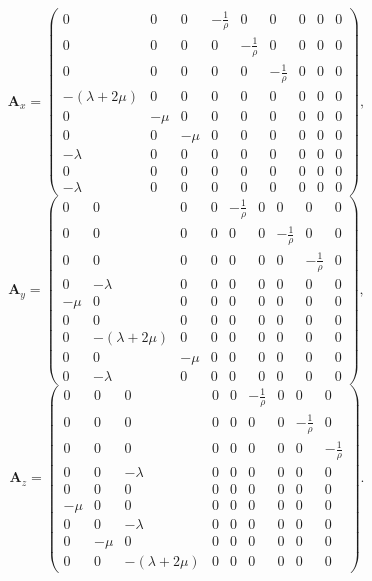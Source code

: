 \begin{displaymath}
\mathbf{A}_x =
\left( \begin{array}{cccccccccccc}
0 & 0 & 0 & -\frac 1 \rho & 0 & 0 & 0 & 0 & 0 \\ 
0 & 0 & 0 & 0 & -\frac 1 \rho & 0 & 0 & 0 & 0 \\ 
0 & 0 & 0 & 0 & 0 & -\frac 1 \rho & 0 & 0 & 0 \\ 
-(\lambda+2\mu) & 0 & 0 & 0 & 0 & 0 & 0 & 0 & 0 \\ 
0 & -\mu & 0 & 0 & 0 & 0 & 0 & 0 & 0 \\ 
0 & 0 & -\mu & 0 & 0 & 0 & 0 & 0 & 0 \\ 
-\lambda & 0 & 0 & 0 & 0 & 0 & 0 & 0 & 0 \\ 
0 & 0 & 0 & 0 & 0 & 0 & 0 & 0 & 0 \\ 
-\lambda & 0 & 0 & 0 & 0 & 0 & 0 & 0 & 0  
\end{array} \right),
\end{displaymath} 
\begin{displaymath}
\mathbf{A}_y =
\left( \begin{array}{cccccccccccc}
0 & 0 & 0 & 0 & -\frac 1 \rho & 0 & 0 & 0 & 0 \\ 
0 & 0 & 0 & 0 & 0 & 0 & -\frac 1 \rho & 0 & 0 \\ 
0 & 0 & 0 & 0 & 0 & 0 & 0 & -\frac 1 \rho & 0 \\ 
0 & -\lambda & 0 & 0 & 0 & 0 & 0 & 0 & 0 \\ 
-\mu & 0 & 0 & 0 & 0 & 0 & 0 & 0 & 0 \\ 
0 & 0 & 0 & 0 & 0 & 0 & 0 & 0 & 0 \\ 
0 & -(\lambda+2\mu) & 0 & 0 & 0 & 0 & 0 & 0 & 0 \\ 
0 & 0 & -\mu & 0 & 0 & 0 & 0 & 0 & 0 \\ 
0 & -\lambda & 0 & 0 & 0 & 0 & 0 & 0 & 0  
\end{array} \right),
\end{displaymath}
\begin{displaymath}
\mathbf{A}_z =
\left( \begin{array}{cccccccccccc}
0 & 0 & 0 & 0 & 0 & -\frac 1 \rho & 0 & 0 & 0 \\ 
0 & 0 & 0 & 0 & 0 & 0 & 0 & -\frac 1 \rho & 0 \\ 
0 & 0 & 0 & 0 & 0 & 0 & 0 & 0 & -\frac 1 \rho \\ 
0 & 0 & -\lambda & 0 & 0 & 0 & 0 & 0 & 0 \\ 
0 & 0 & 0 & 0 & 0 & 0 & 0 & 0 & 0 \\ 
-\mu & 0 & 0 & 0 & 0 & 0 & 0 & 0 & 0 \\ 
0 & 0 & -\lambda & 0 & 0 & 0 & 0 & 0 & 0 \\ 
0 & -\mu & 0 & 0 & 0 & 0 & 0 & 0 & 0 \\ 
0 & 0 & -(\lambda+2\mu) & 0 & 0 & 0 & 0 & 0 & 0  
\end{array} \right).
\end{displaymath}

